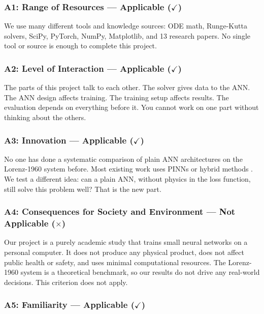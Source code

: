 \subsubsection{A1: Range of Resources --- Applicable ($\checkmark$)}

We use many different tools and knowledge sources: ODE math, Runge-Kutta solvers, SciPy, PyTorch, NumPy, Matplotlib, and 13 research papers. No single tool or source is enough to complete this project.

\subsubsection{A2: Level of Interaction --- Applicable ($\checkmark$)}

The parts of this project talk to each other. The solver gives data to the ANN. The ANN design affects training. The training setup affects results. The evaluation depends on everything before it. You cannot work on one part without thinking about the others.

\subsubsection{A3: Innovation --- Applicable ($\checkmark$)}

No one has done a systematic comparison of plain ANN architectures on the Lorenz-1960 system before. Most existing work uses PINNs or hybrid methods \cite{matthews2024pinnde}. We test a different idea: can a plain ANN, without physics in the loss function, still solve this problem well? That is the new part.

\subsubsection{A4: Consequences for Society and Environment --- Not Applicable ($\times$)}

Our project is a purely academic study that trains small neural networks on a personal computer. It does not produce any physical product, does not affect public health or safety, and uses minimal computational resources. The Lorenz-1960 system is a theoretical benchmark, so our results do not drive any real-world decisions. This criterion does not apply.

\subsubsection{A5: Familiarity --- Applicable ($\checkmark$)}

